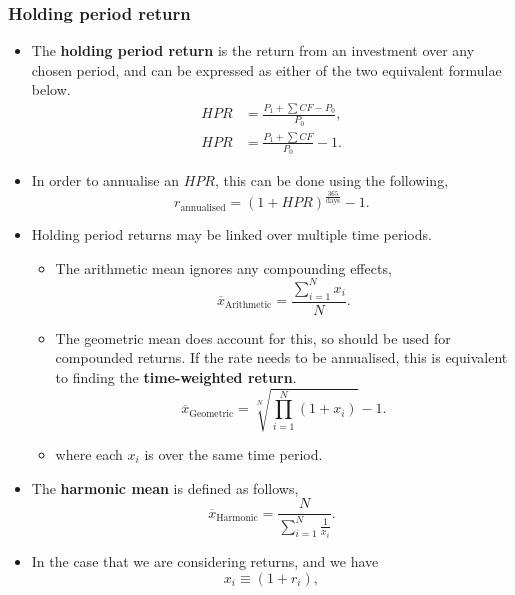 \documentclass[../notes_compiled.tex]{subfiles}
\begin{document}
\subsubsection{Holding period return}
\label{ssec-hpr}
\begin{itemize}
\item The \textbf{holding period return} is the return from an investment over any chosen period, and can be expressed as either of the two equivalent formulae below.
\begin{align}
HPR &= \frac{P_{1}+\sum CF - P_{0}}{P_{0}}, \label{hpr} \\
HPR &= \frac{P_{1}+\sum CF}{P_{0}}-1.
\end{align}

\item[] In order to annualise an $HPR$, this can be done using the following,
\begin{equation}
r_{\text{annualised}} = (1+HPR)^{\frac{365}{\text{days}}}-1. \label{annualhpr}
\end{equation}


\item Holding period returns may be linked over multiple time periods.
\begin{itemize}
\item The arithmetic mean ignores any compounding effects,
\begin{equation}
\overline{x}_{\text{Arithmetic}} = \frac{\sum_{i=1}^{N} x_{i}}{N}.
\end{equation}
\item The geometric mean does account for this, so should be used for compounded returns. If the rate needs to be annualised, this is equivalent to finding the \textbf{time-weighted return}.
\begin{equation}
\overline{x}_{\text{Geometric}} = \sqrt[N]{\prod_{i=1}^{N}(1+x_{i})} - 1.
\end{equation}
\item[] where each $x_{i}$ is over the same time period.
\end{itemize}

\item The \textbf{harmonic mean} is defined as follows,
\begin{equation}
\overline{x}_{\text{Harmonic}} = \frac{N}{\sum_{i=1}^{N}\frac{1}{x_{i}}}. \label{harmonic-mean}
\end{equation}

\item[] In the case that we are considering returns, and we have
\begin{equation*}
x_{i} \equiv (1+r_{i}),
\end{equation*}


\end{itemize}
\end{document}
